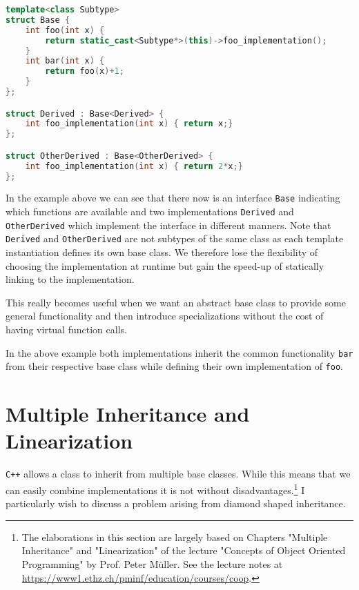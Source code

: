\begin{minipage}{\linewidth}
\begin{lstlisting}[language=C++]
template<class Subtype>
struct Base {
	int foo(int x) {
    	return static_cast<Subtype*>(this)->foo_implementation();
    }
    int bar(int x) {
    	return foo(x)+1;
    }
};

struct Derived : Base<Derived> {
	int foo_implementation(int x) { return x;}
};

struct OtherDerived : Base<OtherDerived> {
	int foo_implementation(int x) { return 2*x;}
};
\end{lstlisting}
\end{minipage}


In the example above we can see that there now is an interface \texttt{Base} indicating which functions are available and two implementations \texttt{Derived} and \texttt{OtherDerived} which implement the interface in different manners.
Note that \texttt{Derived} and \texttt{OtherDerived} are not subtypes of the same class as each template instantiation defines its own base class. We therefore lose the flexibility of choosing the implementation at runtime but gain the speed-up of statically linking to the implementation.

This really becomes useful when we want an abstract base class to provide some general functionality and then introduce specializations without the cost of having virtual function calls. 

In the above example both implementations inherit the common functionality \texttt{bar} from their respective base class while defining their own implementation of \texttt{foo}.

\section{Multiple Inheritance and Linearization}
\texttt{C++} allows a class to inherit from multiple base classes. While this means that we can easily combine implementations it is not without disadvantages.\footnote{The elaborations in this section are largely based on  Chapters "Multiple Inheritance" and "Linearization" of the  lecture "Concepts of Object Oriented Programming" by Prof. Peter M\"uller. See the lecture notes at \url{https://www1.ethz.ch/pminf/education/courses/coop}.} I particularly wish to discuss a problem arising from diamond shaped inheritance.
